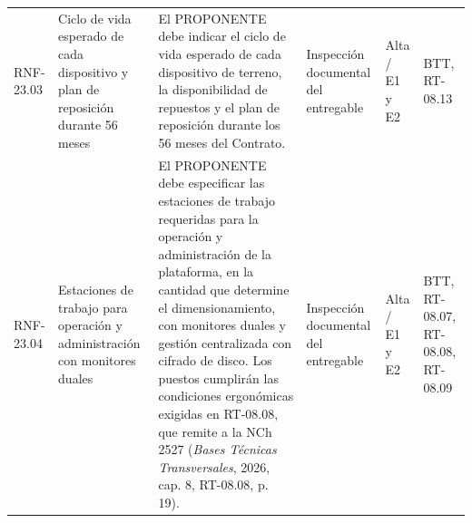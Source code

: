 {\begin{longtable}{@{}F{0.091} F{0.172} F{0.381} F{0.144} F{0.121} F{0.091}@{}}
  RNF-23.03 & Ciclo de vida esperado de cada dispositivo y plan de reposición durante 56 meses & El PROPONENTE debe indicar el ciclo de vida esperado de cada dispositivo de terreno, la disponibilidad de repuestos y el plan de reposición durante los 56 meses del Contrato. & Inspección documental del entregable & Alta / E1 y E2 & BTT, RT-08.13 \\
  RNF-23.04 & Estaciones de trabajo para operación y administración con monitores duales & El PROPONENTE debe especificar las estaciones de trabajo requeridas para la operación y administración de la plataforma, en la cantidad que determine el dimensionamiento, con monitores duales y gestión centralizada con cifrado de disco. Los puestos cumplirán las condiciones ergonómicas exigidas en RT-08.08, que remite a la NCh 2527 (\textit{Bases Técnicas Transversales}, 2026, cap. 8, RT-08.08, p. 19). & Inspección documental del entregable & Alta / E1 y E2 & BTT, RT-08.07, RT-08.08, RT-08.09 \\
\end{longtable}}
